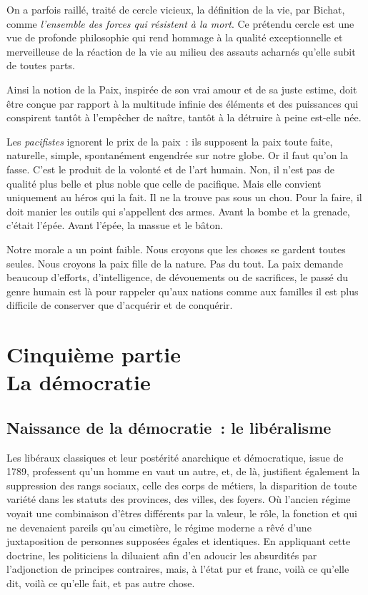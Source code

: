 \documentclass[french,twoside]{book} %
\newcommand{\astermono}{\medskip\centerline{\color{rubric}\large\selectfont{\syms ✻}}\medskip\par}%
\newcommand\chapteropen{} %
\newcommand\chaptercont{} %
\newcommand\chapterclose{} %
\begin{document}
\astermono

\noindent On a parfois raillé, traité de cercle vicieux, la définition de la vie, par Bichat, comme \emph{l’ensemble des forces qui résistent à la mort}. Ce prétendu cercle est une vue de profonde philosophie qui rend hommage à la qualité exceptionnelle et merveilleuse de la réaction de la vie au milieu des assauts acharnés qu’elle subit de toutes parts.\par
Ainsi la notion de la Paix, inspirée de son vrai amour et de sa juste estime, doit être conçue par rapport à la multitude infinie des éléments et des puissances qui conspirent tantôt à l’empêcher de naître, tantôt à la détruire à peine est-elle née.\par
Les \emph{pacifistes} ignorent le prix de la paix : ils supposent la paix toute faite, naturelle, simple, spontanément engendrée sur notre globe. Or il faut qu’on la fasse. C’est le produit de la volonté et de l’art humain. Non, il n’est pas de qualité plus belle et plus noble que celle de pacifique. Mais elle convient uniquement au héros qui la fait. Il ne la trouve pas sous un chou. Pour la faire, il doit manier les outils qui s’appellent des armes. Avant la bombe et la grenade, c’était l’épée. Avant l’épée, la massue et le bâton.\par
Notre morale a un point faible. Nous croyons que les choses se gardent toutes seules. Nous croyons la paix fille de la nature. Pas du tout. La paix demande beaucoup d’efforts, d’intelligence, de dévouements ou de sacrifices, le passé du genre humain est là pour rappeler qu’aux nations comme aux familles il est plus difficile de conserver que d’acquérir et de conquérir.
\chapterclose


\chapteropen
\chapter[Cinquième partie. La démocratie]{Cinquième partie \\
La démocratie}\renewcommand{\leftmark}{Cinquième partie \\
La démocratie}


\chaptercont
\section[Naissance de la démocratie : le libéralisme]{Naissance de la démocratie : le libéralisme}
\noindent Les libéraux classiques et leur postérité anarchique et démocratique, issue de 1789, professent qu’un homme en vaut un autre, et, de là, justifient également la suppression des rangs sociaux, celle des corps de métiers, la disparition de toute variété dans les statuts des provinces, des villes, des foyers. Où l’ancien régime voyait une combinaison d’êtres différents par la valeur, le rôle, la fonction et qui ne devenaient pareils qu’au cimetière, le régime moderne a rêvé d’une juxtaposition de personnes supposées égales et identiques. En appliquant cette doctrine, les politiciens la diluaient afin d’en adoucir les absurdités par l’adjonction de principes contraires, mais, à l’état pur et franc, voilà ce qu’elle dit, voilà ce qu’elle fait, et pas autre chose.
\end{document}
